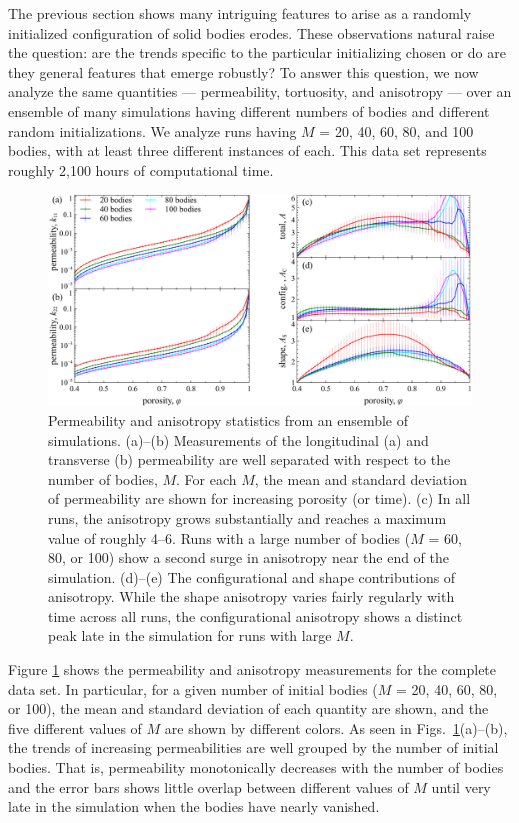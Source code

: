 \documentclass[3p]{elsarticle}
\begin{document}
The previous section shows many intriguing features to arise as a randomly initialized configuration of solid bodies erodes. These observations natural raise the question: are the trends specific to the particular initializing chosen or do are they general features that emerge robustly? To answer this question, we now analyze the same quantities --- permeability, tortuosity, and anisotropy --- over an ensemble of many simulations having different numbers of bodies and different random initializations. We analyze runs having $M$ = 20, 40, 60, 80, and 100 bodies, with at least three different instances of each. This data set represents roughly 2,100 hours of computational time.

\begin{figure}%
\centering
\includegraphics[width = 0.9 \textwidth]{./figs/fig5.pdf}
\caption{ Permeability and anisotropy statistics from an ensemble of simulations.
(a)--(b) Measurements of the longitudinal (a) and transverse (b) permeability are well separated with respect to the number of bodies, $M$. For each $M$, the mean and standard deviation of permeability are shown for increasing porosity (or time). (c) In all runs, the anisotropy grows substantially and reaches a maximum value of roughly 4--6. Runs with a large number of bodies ($M$ = 60, 80, or 100) show a second surge in anisotropy near the end of the simulation. (d)--(e) The configurational and shape contributions of anisotropy. While the shape anisotropy varies fairly regularly with time across all runs, the configurational anisotropy shows a distinct peak late in the simulation for runs with large $M$.
\label{fig5}
}
\end{figure}

Figure \ref{fig5} shows the permeability and anisotropy measurements for the complete data set. In particular, for a given number of initial bodies ($M$ = 20, 40, 60, 80, or 100), the mean and standard deviation of each quantity are shown, and the five different values of $M$ are shown by different colors. As seen in Figs.~\ref{fig5}(a)--(b), the trends of increasing permeabilities are well grouped by the number of initial bodies. That is, permeability monotonically decreases with the number of bodies and the error bars shows little overlap between different values of $M$ until very late in the simulation when the bodies have nearly vanished. 
\end{document}
